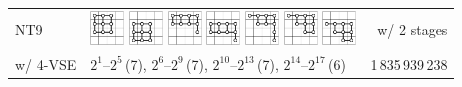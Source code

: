 \documentclass[runningheads]{llncs}
\begin{document}
\begin{tabular}{ll@{~~}r}
\textsf{NT9}
&
\includegraphics[width=0.9cm]{figures/NTuple-90.pdf}
\includegraphics[width=0.9cm]{figures/NTuple-91.pdf}
\includegraphics[width=0.9cm]{figures/NTuple-92.pdf}
\includegraphics[width=0.9cm]{figures/NTuple-93.pdf}
\includegraphics[width=0.9cm]{figures/NTuple-94.pdf}
\includegraphics[width=0.9cm]{figures/NTuple-95.pdf}
\includegraphics[width=0.9cm]{figures/NTuple-96.pdf}
& w/ 2 stages\\
w/ 4-VSE & \phantom{\rule{1pt}{9.5pt}} $2^1$--$2^{5}$\,(7), $2^{6}$--$2^{9}$\,(7), $2^{10}$--$2^{13}$\,(7), $2^{14}$--$2^{17}$\,(6)    &  1\,835\,939\,238 \\\hline
\end{tabular}
\end{document}

